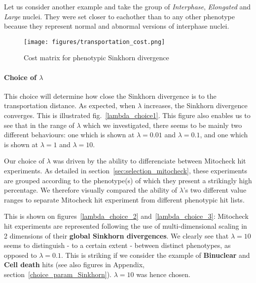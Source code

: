 Let us consider another example and take the group of \textit{Interphase}, \textit{Elongated} and \textit{Large} nuclei. They were set closer to eachother than to any other phenotype because they represent normal and abnormal versions of interphase nuclei.

\begin{figure*}[ht!]
\centerline{\texttt{[image: figures/transportation\_cost.png]}
}
\caption{Cost matrix for phenotypic Sinkhorn divergence}
\label{cost}
\end{figure*}

\paragraph{Choice of $\lambda$} This choice will determine how close the Sinkhorn divergence is to the transportation distance. As expected, when $\lambda$ increases, the Sinkhorn divergence converges. This is illustrated fig.~\ref{lambda_choice1}. This figure also enables us to see that in the range of $\lambda$ which we investigated, there seems to be mainly two different behaviours: one which is shown at $\lambda=0.01$ and $\lambda=0.1$, and one which is shown at $\lambda=1$ and $\lambda=10$.

Our choice of $\lambda$ was driven by the ability to differenciate between Mitocheck hit experiments. As detailed in section~\ref{sec:selection_mitocheck}, these experiments are grouped according to the phenotype(s) of which they present a strikingly high percentage. We therefore visually compared the ability of $\lambda$'s two different value ranges to separate Mitocheck hit experiment from different phenotypic hit lists. 

This is shown on figures~\ref{lambda_choice_2} and~\ref{lambda_choice_3}: Mitocheck hit experiments are represented following the use of multi-dimensional scaling in 2 dimensions of their \textbf{global Sinkhorn divergences}. We clearly see that $\lambda=10$ seems to distinguish - to a certain extent - between distinct phenotypes, as opposed to $\lambda=0.1$. This is striking if we consider the example of \textbf{Binuclear} and \textbf{Cell death} hits (see also figures in Appendix, section~\ref{choice_param_Sinkhorn}). $\lambda=10$ was hence chosen.

